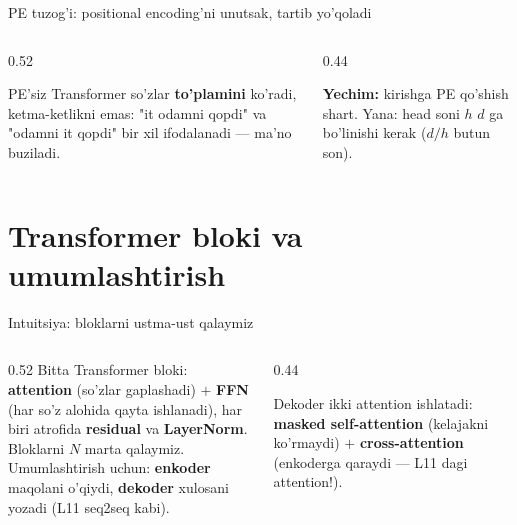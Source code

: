 \documentclass[aspectratio=169,11pt]{beamer}
\begin{document}
\begin{frame}{PE tuzog'i: positional encoding'ni unutsak, tartib yo'qoladi}
  \begin{columns}[T]
    \begin{column}{0.52\textwidth}
      \begin{tcolorbox}[warnbox,title={Tartibsiz model}]
        \small
        PE'siz Transformer so'zlar \textbf{to'plamini} ko'radi, ketma-ketlikni
        emas: "it odamni qopdi" va "odamni it qopdi" bir xil ifodalanadi ---
        ma'no buziladi.
      \end{tcolorbox}
    \end{column}
    \begin{column}{0.44\textwidth}
      \begin{tcolorbox}[okbox,top=2pt,bottom=2pt]
        \footnotesize
        \textbf{Yechim:} kirishga PE qo'shish shart. Yana: head soni $h$
        $d$ ga bo'linishi kerak ($d/h$ butun son).
      \end{tcolorbox}
    \end{column}
  \end{columns}
\end{frame}

\section[Transformer bloki]{Transformer bloki va umumlashtirish}

\begin{frame}{Intuitsiya: bloklarni ustma-ust qalaymiz}
  \begin{columns}[T]
    \begin{column}{0.52\textwidth}
      \small
      Bitta Transformer bloki: \textbf{attention} (so'zlar gaplashadi) $+$
      \textbf{FFN} (har so'z alohida qayta ishlanadi), har biri atrofida
      \textbf{residual} va \textbf{LayerNorm}.\\[5pt]
      Bloklarni $N$ marta qalaymiz. Umumlashtirish uchun: \textbf{enkoder}
      maqolani o'qiydi, \textbf{dekoder} xulosani yozadi (L11 seq2seq kabi).
    \end{column}
    \begin{column}{0.44\textwidth}
      \begin{tcolorbox}[okbox,top=2pt,bottom=2pt]
        \footnotesize
        Dekoder ikki attention ishlatadi: \textbf{masked self-attention}
        (kelajakni ko'rmaydi) $+$ \textbf{cross-attention} (enkoderga qaraydi
        --- L11 dagi attention!).
      \end{tcolorbox}
    \end{column}
  \end{columns}
\end{frame}
\end{document}
